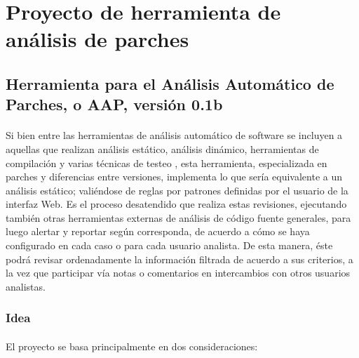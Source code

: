 \documentclass[11pt,a4paper]{article}
\begin{document}
\section{Proyecto de herramienta de análisis de parches}

\subsection{Herramienta para el Análisis Automático de Parches, o AAP, versión 0.1b}

\paragraph{}Si bien entre las herramientas de análisis automático de software se incluyen a aquellas que realizan análisis estático, análisis dinámico, herramientas de compilación y varias técnicas de testeo \cite{sei1}, esta herramienta, especializada en parches y diferencias entre versiones, implementa lo que sería equivalente a un análisis estático; valiéndose de reglas por patrones definidas por el usuario de la interfaz Web. Es el proceso desatendido que realiza estas revisiones, ejecutando también otras herramientas externas de análisis de código fuente generales, para luego alertar y reportar según corresponda, de acuerdo a cómo se haya configurado en cada caso o para cada usuario analista. De esta manera, éste podrá revisar ordenadamente la información filtrada de acuerdo a sus criterios, a la vez que participar vía notas o comentarios en intercambios con otros usuarios analistas.
\\

\subsubsection{Idea}

\paragraph{}El proyecto se basa principalmente en dos consideraciones:
\end{document}
